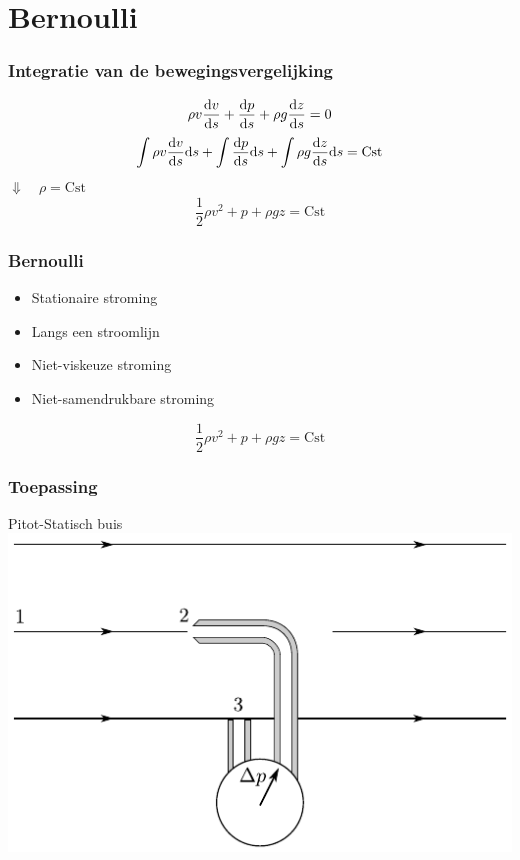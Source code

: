 \documentclass[t]{beamer}
\begin{document}
	\section{Bernoulli}
	\begin{frame}
		\frametitle{Integratie van de bewegingsvergelijking}
		\vspace{1cm}
		\begin{equation*}
			\rho v \frac{\mathrm{d} v}{\mathrm{d} s} + \frac{\mathrm{d} p}{\mathrm{d} s} + \rho g \frac{\mathrm{d} z}{\mathrm{d} s} = 0
		\end{equation*}
		\pause
		\vspace{0.5cm}
		\begin{equation*}
			\int \rho v \frac{\mathrm{d} v}{\mathrm{d} s} \mathrm{d} s + \int \frac{\mathrm{d} p}{\mathrm{d} s} \mathrm{d} s + \int \rho g \frac{\mathrm{d} z}{\mathrm{d} s}  \mathrm{d} s = \textrm{Cst}
		\end{equation*}
		\pause
        \hspace{5cm} $\Downarrow \quad \rho = \textrm{Cst}$ 
		\begin{equation}
			\frac{1}{2} \rho v^2 + p + \rho g z = \textrm{Cst}
			\label{eqn:vergelijking van Bernoulli}
		\end{equation}
  	\end{frame}
  	\begin{frame}
  		\frametitle{Bernoulli}
  		\begin{itemize}
  			\pause
  			\item Stationaire stroming
  			\pause
  			\item Langs een stroomlijn
  			\pause
  			\item Niet-viskeuze stroming
  			\pause
  			\item Niet-samendrukbare stroming
  		\end{itemize}
  		\pause
  		\vspace{1cm}
  		\begin{equation*}
			\frac{1}{2} \rho v^2 + p + \rho g z = \textrm{Cst}
		\end{equation*}
  	\end{frame}
	\begin{frame}
		\frametitle{Toepassing}
		Pitot-Statisch buis
		\pause
		\vspace{0.5cm}
		\center
		\includegraphics{fig/deeltjesvergelijkingen/Pitotstatischbuis}
	\end{frame}
\end{document}
